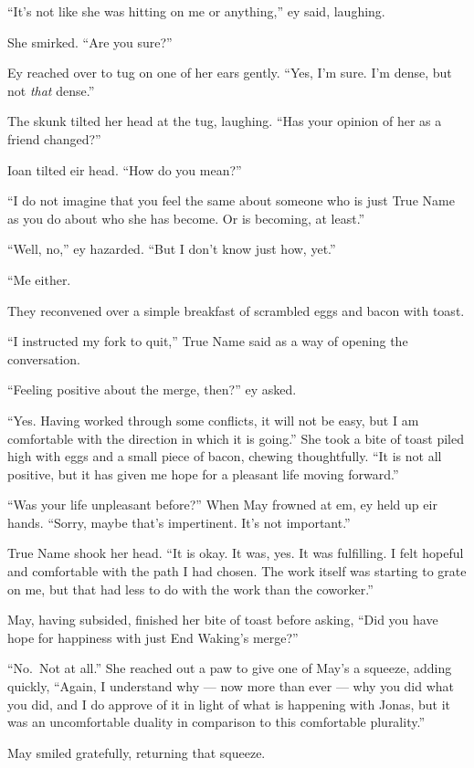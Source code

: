 ``It's not like she was hitting on me or anything,'' ey said, laughing.

She smirked. ``Are you sure?''

Ey reached over to tug on one of her ears gently. ``Yes, I'm sure. I'm dense, but not \emph{that} dense.''

The skunk tilted her head at the tug, laughing. ``Has your opinion of her as a friend changed?''

Ioan tilted eir head. ``How do you mean?''

``I do not imagine that you feel the same about someone who is just True Name as you do about who she has become. Or is becoming, at least.''

``Well, no,'' ey hazarded. ``But I don't know just how, yet.''

``Me either.

They reconvened over a simple breakfast of scrambled eggs and bacon with toast.

``I instructed my fork to quit,'' True Name said as a way of opening the conversation.

``Feeling positive about the merge, then?'' ey asked.

``Yes. Having worked through some conflicts, it will not be easy, but I am comfortable with the direction in which it is going.'' She took a bite of toast piled high with eggs and a small piece of bacon, chewing thoughtfully. ``It is not all positive, but it has given me hope for a pleasant life moving forward.''

``Was your life unpleasant before?'' When May frowned at em, ey held up eir hands. ``Sorry, maybe that's impertinent. It's not important.''

True Name shook her head. ``It is okay. It was, yes. It was fulfilling. I felt hopeful and comfortable with the path I had chosen. The work itself was starting to grate on me, but that had less to do with the work than the coworker.''

May, having subsided, finished her bite of toast before asking, ``Did you have hope for happiness with just End Waking's merge?''

``No.~Not at all.'' She reached out a paw to give one of May's a squeeze, adding quickly, ``Again, I understand why — now more than ever — why you did what you did, and I do approve of it in light of what is happening with Jonas, but it was an uncomfortable duality in comparison to this comfortable plurality.''

May smiled gratefully, returning that squeeze.

